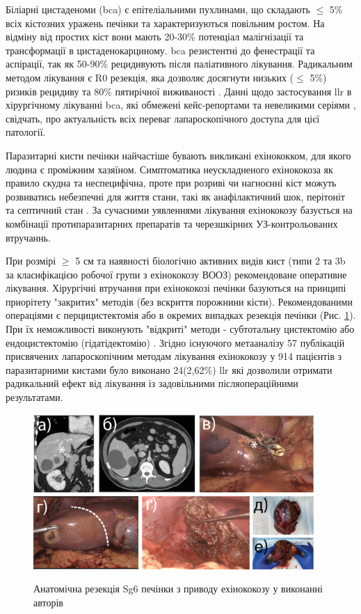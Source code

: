 \begin{refsection}
Біліарні цистаденоми (\acrshort{bca}) є епітеліальними пухлинами, що складають $\leq$ 5\% всіх кістозних уражень печінки та характеризуються повільним ростом. На відміну від простих кіст вони  мають 20-30\% потенціал малігнізації та трансформації в цистаденокарциному. \acrshort{bca} резистентні до фенестрації та аспірації, так як 50-90\% рецидивують після паліативного лікування. Радикальним методом лікування є R0 резекція, яка дозволяє досягнути низьких ($\leq$ 5\%) ризиків рецидиву та 80\% пятирічної виживаності \cite{Soares2015}. Данні щодо застосування \acrshort{llr} в хірургічному лікуванні \acrshort{bca}, які обмежені кейс-репортами \cite{Machado2014, Li2016a} та невеликими серіями \cite{Koffron2004}, свідчать, про актуальність всіх переваг лапароскопічного доступа для цієї патології.

Паразитарні кисти печінки найчастіше бувають викликані ехінококком, для якого людина є проміжним хазяїном. Симптоматика неускладненого ехінококоза як правило скудна та неспецифічна, проте при розриві чи нагноєнні кіст можуть розвиватись небезпечні для життя стани, такі як анафілактичний шок, перітоніт та септичний стан \cite{Finazzi2015}. За сучасними уявленнями лікування ехінококозу базується на комбінації протипаразитарних препаратів та черезшкірних УЗ-контрольованих втручаннь. 

При розмірі $\geq$ 5 см та наявності біологічно активних видів кист (типи 2 та 3b за класифікацією робочої групи з ехінококозу ВООЗ) рекомендоване оперативне лікування. Хірургічні втручання при ехінококозі печінки базуються на принципі приорітету "закритих" методів (без вскриття порожнини кісти). Рекомендованими операціями є перцицистектомія або в окремих випадках резекція печінки (Рис. \ref{fig:ECC-Sg6}). При їх неможливості виконують "відкриті" методи - субтотальну цистектомію або ендоцистектомію (гідатідектомію) \cite{Wen2019}. Згідно існуючого метааналізу 57 публікацій присвячених лапароскопічним методам лікування ехінококозу у 914 пацієнтів з паразитарними кистами було виконано 24(2,62\%) \acrshort{llr} які дозволили отримати радикальний ефект від лікування із задовільними післяопераційними результатами.  

 


\begin{figure}[htbp]
\caption{Анатомічна резекція Sg6 печінки з приводу ехінококозу у виконанні авторів}
\includegraphics[width=0.95\textwidth]{Illustrations/Chapter_01/ECC-Sg6.png}
\label{fig:ECC-Sg6}


\end{figure}
\end{refsection}
